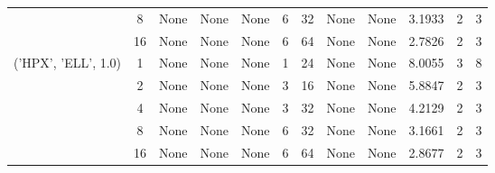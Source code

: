 \begin{tabular}{cccccccccccc}
& 8& None& None& None& 6& 32& None& None& 3.1933& 2& 3\\
& 16& None& None& None& 6& 64& None& None& 2.7826& 2& 3\\
\hline
\multirow{5}{*}{('HPX', 'ELL', 1.0)}& 1& None& None& None& 1& 24& None& None& 8.0055& 3& 8\\
& 2& None& None& None& 3& 16& None& None& 5.8847& 2& 3\\
& 4& None& None& None& 3& 32& None& None& 4.2129& 2& 3\\
& 8& None& None& None& 6& 32& None& None& 3.1661& 2& 3\\
& 16& None& None& None& 6& 64& None& None& 2.8677& 2& 3\\
\hline
\end{tabular}
